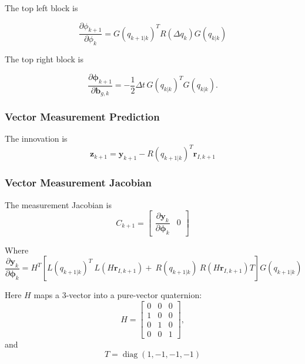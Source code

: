 \documentclass[conference,onecolumn,draftclsnofoot]{IEEEtran}
\begin{document}
The top left block is

\begin{equation}
\frac{\partial \boldsymbol{}{\phi}_{k+1}}{\partial \boldsymbol{}{\phi}_k}
=
G(q_{k+1|k})^T R(\Delta q_k)G(q_{k|k})
\end{equation}


The top right block is

\begin{equation}
\dfrac{\partial \boldsymbol{\phi}_{k+1}}
      {\partial \mathbf b_{g,k}}
=
-\frac{1}{2}\Delta t\,
G(q_{k|k})^TG(q_{k|k}).
\end{equation}

\subsubsection{Vector Measurement Prediction}

The innovation is
\begin{equation}
\mathbf z_{k+1}
=
\mathbf y_{k+1}
-
R( q_{k+1|k})^T
\mathbf r_{I,k+1}
\end{equation}

\subsubsection{Vector Measurement Jacobian}

The measurement Jacobian is
\begin{equation}
C_{k+1}
=
\begin{bmatrix}
\dfrac{\partial \boldsymbol{y}_{k}}
      {\partial \boldsymbol{\phi}_{k}}
 & 0
\end{bmatrix}
\end{equation}

Where
\begin{equation}
\dfrac{\partial \boldsymbol{y}_{k}}
      {\partial \boldsymbol{\phi}_{k}}
=
H^T
\left[
  L(q_{k+1|k})^T
\ L(H\mathbf r_{I,k+1})
+
\ R( q_{k+1|k})
\ R(H\mathbf r_{I,k+1})
T
\right]
G(q_{k+1|k})
\end{equation}

Here \(H\) maps a 3-vector into a pure-vector quaternion:
\begin{equation}
H
=
\begin{bmatrix}
0 & 0 & 0\\
1 & 0 & 0\\
0 & 1 & 0\\
0 & 0 & 1
\end{bmatrix},
\end{equation}
and
\begin{equation}
T
=
\operatorname{diag}(1,-1,-1,-1)
\end{equation}
\end{document}
